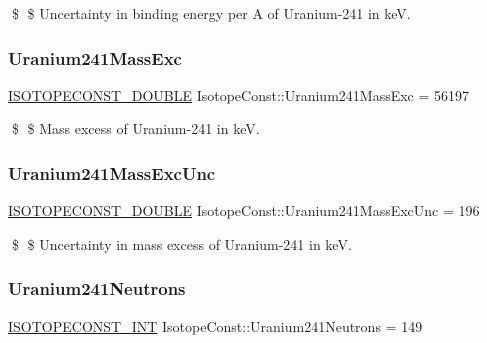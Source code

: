 \$ \$ Uncertainty in binding energy per A of Uranium-\/241 in keV. \mbox{\label{group___isotope_const-_uranium-_u241_gade5c471f45b08a17d8bc74c1466ad411}} 
\subsubsection{\texorpdfstring{Uranium241\+Mass\+Exc}{Uranium241MassExc}}
{\footnotesize\ttfamily \mbox{\hyperlink{group___isotope_const-_macros_ga8f45a7272ce02c0b4c65c44636ed719a}{I\+S\+O\+T\+O\+P\+E\+C\+O\+N\+S\+T\+\_\+\+D\+O\+U\+B\+LE}} Isotope\+Const\+::\+Uranium241\+Mass\+Exc = 56197}

\$ \$ Mass excess of Uranium-\/241 in keV. \mbox{\label{group___isotope_const-_uranium-_u241_ga6c3da902c5a62a4f27f91d18fdf1d2ce}} 
\subsubsection{\texorpdfstring{Uranium241\+Mass\+Exc\+Unc}{Uranium241MassExcUnc}}
{\footnotesize\ttfamily \mbox{\hyperlink{group___isotope_const-_macros_ga8f45a7272ce02c0b4c65c44636ed719a}{I\+S\+O\+T\+O\+P\+E\+C\+O\+N\+S\+T\+\_\+\+D\+O\+U\+B\+LE}} Isotope\+Const\+::\+Uranium241\+Mass\+Exc\+Unc = 196}

\$ \$ Uncertainty in mass excess of Uranium-\/241 in keV. \mbox{\label{group___isotope_const-_uranium-_u241_gab97e1dda2432aaa2f4f847b8ffbc8e37}} 
\subsubsection{\texorpdfstring{Uranium241\+Neutrons}{Uranium241Neutrons}}
{\footnotesize\ttfamily \mbox{\hyperlink{group___isotope_const-_macros_ga5f18360b3e99483a35c32d789e62621c}{I\+S\+O\+T\+O\+P\+E\+C\+O\+N\+S\+T\+\_\+\+I\+NT}} Isotope\+Const\+::\+Uranium241\+Neutrons = 149}

